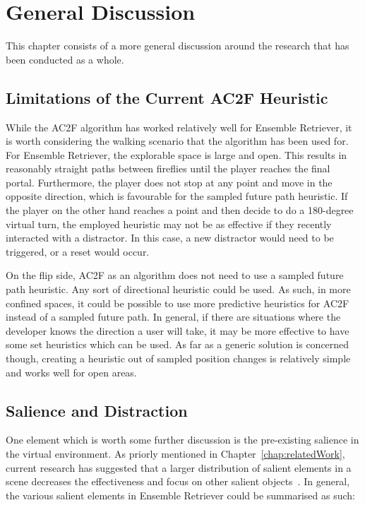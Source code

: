 \chapter{General Discussion}\label{chap:discussion}
This chapter consists of a more general discussion around the research that has been conducted as a whole. 

\section{Limitations of the Current AC2F Heuristic}
While the AC2F algorithm has worked relatively well for Ensemble Retriever, it is worth considering the walking scenario that the algorithm has been used for. For Ensemble Retriever, the explorable space is large and open. This results in reasonably straight paths between fireflies until the player reaches the final portal. Furthermore, the player does not stop at any point and move in the opposite direction, which is favourable for the sampled future path heuristic. If the player on the other hand reaches a point and then decide to do a 180-degree virtual turn, the employed heuristic may not be as effective if they recently interacted with a distractor. In this case, a new distractor would need to be triggered, or a reset would occur. 

On the flip side, AC2F as an algorithm does not need to use a sampled future path heuristic. Any sort of directional heuristic could be used. As such, in more confined spaces, it could be possible to use more predictive heuristics for AC2F instead of a sampled future path. In general, if there are situations where the developer knows the direction a user will take, it may be more effective to have some set heuristics which can be used. As far as a generic solution is concerned though, creating a heuristic out of sampled position changes is relatively simple and works well for open areas. 
   
\section{Salience and Distraction}
One element which is worth some further discussion is the pre-existing salience in the virtual environment. As priorly mentioned in Chapter~\ref{chap:relatedWork}, current research has suggested that a larger distribution of salient elements in a scene decreases the effectiveness and focus on other salient objects~\cite{sitzmann2018saliency}. In general, the various salient elements in Ensemble Retriever could be summarised as such:

